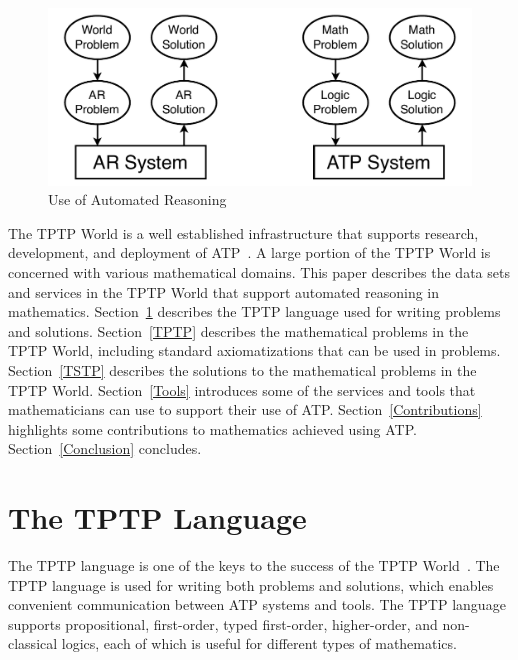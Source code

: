\documentclass[runningheads]{llncs}
\begin{document}
\begin{figure}[htb]
\centering
\includegraphics[width=1.0\textwidth]{UseOfAR.pdf}
\vspace*{-1em}
\caption{Use of Automated Reasoning}
\label{UseOfAR}
\end{figure}

The TPTP World is a well established infrastructure that supports research, development, and 
deployment of ATP~\cite{Sut10,Sut17}.
A large portion of the TPTP World is concerned with various mathematical domains.
This paper describes the data sets and services in the TPTP World that support automated reasoning 
in mathematics.
Section~\ref{Languages} describes the TPTP language used for writing problems and solutions.
Section~\ref{TPTP} describes the mathematical problems in the TPTP World, including standard 
axiomatizations that can be used in problems.
Section~\ref{TSTP} describes the solutions to the mathematical problems in the TPTP World.
Section~\ref{Tools} introduces some of the services and tools that mathematicians can use to
support their use of ATP.
Section~\ref{Contributions} highlights some contributions to mathematics achieved using ATP.
Section~\ref{Conclusion} concludes.

\section{The TPTP Language}
\label{Languages}

The TPTP language is one of the keys to the success of the TPTP World~\cite{Sut23-IGPL}.
The TPTP language is used for writing both problems and solutions, which enables convenient 
communication between ATP systems and tools.
The TPTP language supports propositional, first-order, typed first-order, higher-order, and
non-classical logics, each of which is useful for different types of mathematics.
\end{document}
